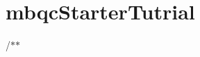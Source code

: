 \chapter{mbqc\+Starter\+Tutrial}
\hypertarget{md_examples_2mbqc_starter_tutrial}{}\label{md_examples_2mbqc_starter_tutrial}
/\texorpdfstring{$\ast$}{*}\texorpdfstring{$\ast$}{*}
\begin{DoxyItemize}
\item 
\end{DoxyItemize}